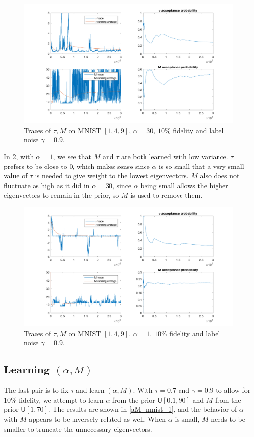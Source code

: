 \documentclass{siamart1116}
\begin{document}
        \begin{figure}[!htb]
        \centering
        \caption{\label{tM_mnist_1}Traces of $\tau, M$ on MNIST $[1, 4, 9]$, $\alpha = 30$, $10\%$ fidelity and label noise $\gamma = 0.9$.}
        \includegraphics[width=0.8\linewidth]{choose_hyp/t_M/alpha=30.png}
        \end{figure}

        In \cref{tM_mnist_2}, with $\alpha=1$, we see that $M$ and $\tau$ are both learned with low variance. $\tau$ prefers to be close to $0$, which makes sense since $\alpha$ is so small that a very small value of $\tau$ is needed to give weight to the lowest eigenvectors. $M$ also does not fluctuate as high as it did in $\alpha=30$, since $\alpha$ being small allows the higher eigenvectors to remain in the prior, so $M$ is used to remove them.

        \begin{figure}[!htb]
        \centering
        \caption{\label{tM_mnist_2}Traces of $\tau, M$ on MNIST $[1, 4, 9]$, $\alpha = 1$, $10\%$ fidelity and label noise $\gamma = 0.9$.}
        \includegraphics[width=0.8\linewidth]{choose_hyp/t_M/alpha=1.png}
        \end{figure}

    \subsection{Learning $(\alpha, M)$}
        The last pair is to fix $\tau$ and learn $(\alpha, M)$. With $\tau=0.7$ and $\gamma=0.9$ to allow for $10\%$ fidelity, we attempt to learn $\alpha$ from the prior $\mathsf{U}[0.1, 90]$ and $M$ from the prior $\mathsf{U}[1,70]$. The results are shown in \cref{aM_mnist_1}, and the behavior of $\alpha$ with $M$ appears to be inversely related as well. When $\alpha$ is small, $M$ needs to be smaller to truncate the unnecessary eigenvectors.
\end{document}
